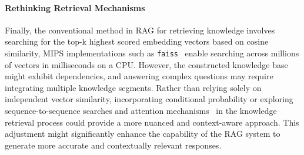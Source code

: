 \paragraph{Rethinking Retrieval Mechanisms} Finally, the conventional method in RAG for retrieving knowledge involves searching for the top-k highest scored embedding vectors based on cosine similarity, MIPS implementations such as \texttt{faiss}~\citep{faiss} enable searching across millions of vectors in milliseconds on a CPU. However, the constructed knowledge base might exhibit dependencies, and answering complex questions may require integrating multiple knowledge segments. Rather than relying solely on independent vector similarity, incorporating conditional probability or exploring sequence-to-sequence searches and attention mechanisms~\citep{vaswani2023attention} in the knowledge retrieval process could provide a more nuanced and context-aware approach. This adjustment might significantly enhance the capability of the RAG system to generate more accurate and contextually relevant responses.